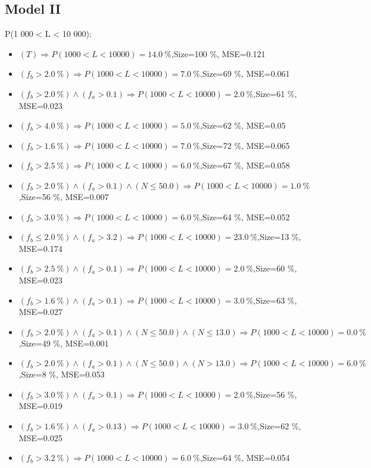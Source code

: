 \documentclass[numbered]{CSL}
\begin{document}
\subsection{Model II}
P(1 000 < L < 10 000):
\begin{itemize}
\item $(T) \Rightarrow P(1 000 < L < 10 000) = 14.0~\%$,\hfill Size=100 \%, MSE=0.121
\item $(f_b > 2.0~\%) \Rightarrow P(1 000 < L < 10 000) = 7.0~\%$,\hfill Size=69 \%, MSE=0.061
\item $(f_b > 2.0~\%) \land (f_a > 0.1) \Rightarrow P(1 000 < L < 10 000) = 2.0~\%$,\hfill Size=61 \%, MSE=0.023
\item $(f_b > 4.0~\%) \Rightarrow P(1 000 < L < 10 000) = 5.0~\%$,\hfill Size=62 \%, MSE=0.05
\item $(f_b > 1.6~\%) \Rightarrow P(1 000 < L < 10 000) = 7.0~\%$,\hfill Size=72 \%, MSE=0.065
\item $(f_b > 2.5~\%) \Rightarrow P(1 000 < L < 10 000) = 6.0~\%$,\hfill Size=67 \%, MSE=0.058
\item $(f_b > 2.0~\%) \land (f_a > 0.1) \land (N \leq 50.0) \Rightarrow P(1 000 < L < 10 000) = 1.0~\%$,\hfill Size=56 \%, MSE=0.007
\item $(f_b > 3.0~\%) \Rightarrow P(1 000 < L < 10 000) = 6.0~\%$,\hfill Size=64 \%, MSE=0.052
\item $(f_b \leq 2.0~\%) \land (f_a > 3.2) \Rightarrow P(1 000 < L < 10 000) = 23.0~\%$,\hfill Size=13 \%, MSE=0.174
\item $(f_b > 2.5~\%) \land (f_a > 0.1) \Rightarrow P(1 000 < L < 10 000) = 2.0~\%$,\hfill Size=60 \%, MSE=0.023
\item $(f_b > 1.6~\%) \land (f_a > 0.1) \Rightarrow P(1 000 < L < 10 000) = 3.0~\%$,\hfill Size=63 \%, MSE=0.027
\item $(f_b > 2.0~\%) \land (f_a > 0.1) \land (N \leq 50.0) \land (N \leq 13.0) \Rightarrow P(1 000 < L < 10 000) = 0.0~\%$,\hfill Size=49 \%, MSE=0.001
\item $(f_b > 2.0~\%) \land (f_a > 0.1) \land (N \leq 50.0) \land (N > 13.0) \Rightarrow P(1 000 < L < 10 000) = 6.0~\%$,\hfill Size=8 \%, MSE=0.053
\item $(f_b > 3.0~\%) \land (f_a > 0.1) \Rightarrow P(1 000 < L < 10 000) = 2.0~\%$,\hfill Size=56 \%, MSE=0.019
\item $(f_b > 1.6~\%) \land (f_a > 0.13) \Rightarrow P(1 000 < L < 10 000) = 3.0~\%$,\hfill Size=62 \%, MSE=0.025
\item $(f_b > 3.2~\%) \Rightarrow P(1 000 < L < 10 000) = 6.0~\%$,\hfill Size=64 \%, MSE=0.054

\end{itemize}
\end{document}
